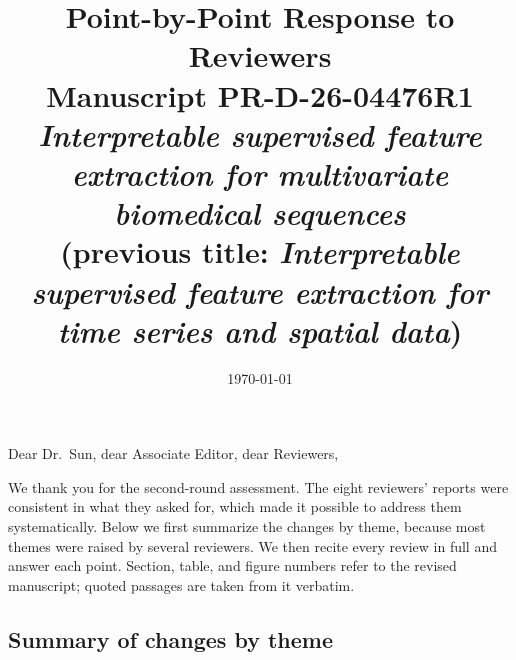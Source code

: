 \documentclass[11pt]{article}
\title{Point-by-Point Response to Reviewers\\[0.3em]
\large Manuscript PR-D-26-04476R1\\
\textit{Interpretable supervised feature extraction for multivariate biomedical sequences}\\
\normalsize (previous title: \textit{Interpretable supervised feature extraction for time series and spatial data})}
\date{\today}
\begin{document}
\maketitle

\noindent Dear Dr.~Sun, dear Associate Editor, dear Reviewers,

We thank you for the second-round assessment. The eight reviewers' reports
were consistent in what they asked for, which made it possible to
address them systematically. Below we first summarize the changes by theme, because most themes were
raised by several reviewers. We then recite every review in full and answer each point. Section,
table, and figure numbers refer to the revised manuscript; quoted passages are taken from
it verbatim.

\subsection*{Summary of changes by theme}
\end{document}
